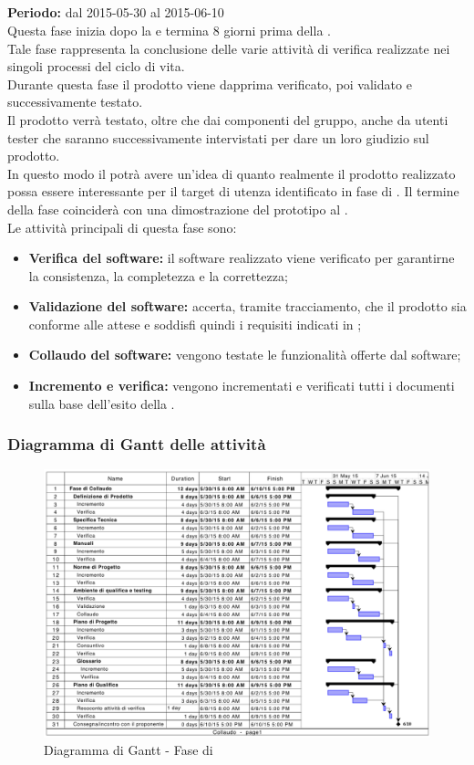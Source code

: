 \subsection{\fVVt}\label{col}
\textbf{Periodo:} dal 2015-05-30 al 2015-06-10\\
Questa fase inizia dopo la \RQ e termina 8 giorni prima della \RA.\\
Tale fase rappresenta la conclusione delle varie attività di verifica realizzate nei singoli processi del ciclo di vita.\\
Durante questa fase il prodotto viene dapprima verificato, poi validato e successivamente testato. \\
Il prodotto verrà testato, oltre che dai componenti del gruppo, anche da utenti tester che saranno successivamente intervistati per dare un loro giudizio sul prodotto. \\
In questo modo il  potrà avere un'idea di quanto realmente il prodotto realizzato possa essere interessante per il target di utenza identificato in fase di \AR.
Il termine della fase \fVVt coinciderà con una dimostrazione del prototipo al . \\
Le attività principali di questa fase sono:
\begin{itemize}
\item \textbf{Verifica del software:} il software realizzato viene verificato per garantirne la consistenza, la completezza e la correttezza;
\item \textbf{Validazione del software:} accerta, tramite tracciamento, che il prodotto sia conforme alle attese e soddisfi quindi i requisiti indicati in \analisiDeiRequisiti;
\item \textbf{Collaudo del software:} vengono testate le funzionalità offerte dal software;
\item \textbf{Incremento e verifica:} vengono incrementati e verificati tutti i documenti sulla base dell'esito della \RQ.
\end{itemize}
\newpage
\subsubsection{Diagramma di Gantt delle attività}
\begin{figure}[h]
\centering
\includegraphics[width=\textwidth,keepaspectratio]{../immagini/gantt/collaudoP.png}
\caption{Diagramma di Gantt - Fase di \fVVt}\label{fig:ganttFVV}
\end{figure}
\FloatBarrier
